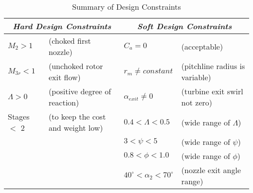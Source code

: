 \begin{table}[H]
    \caption{Summary of Design Constraints}
    \label{tab:designconstraints}
    \centering
    \begin{tabular}[H]{l l l l}
    \toprule[1pt]
    \multicolumn{2}{c}{\textit{Hard Design Constraints}}    & \multicolumn{2}{c}{\textit{Soft Design Constraints}}                    \\
    \midrule
    $M_2 > 1$     & (choked first nozzle)         &   $C_a = 0$           &  (acceptable) \\
    $M_{3r} < 1$     & (unchoked rotor exit flow)       &  $r_m \neq constant$     & (pitchline radius is variable)  \\
    $\Lambda > 0$ & (positive degree of reaction) &  $\alpha_{exit} \neq 0$  & (turbine exit swirl not zero) \\
    Stages $<$ 2  & (to keep the cost and weight low)        &  $0.4 < \Lambda < 0.5$     &      (wide range of $\Lambda$)\\
                  &                               &   $3 < \psi < 5$         &  (wide range of $\psi$)    \\
                  &                               &     $0.8 < \phi < 1.0$   &     (wide range of $\phi$)   \\
                  &                               & $40^{\circ} < \alpha_2 < 70^{\circ}$ & (nozzle exit angle range) \\
    \midrule[1pt]
    \end{tabular}
  \end{table}